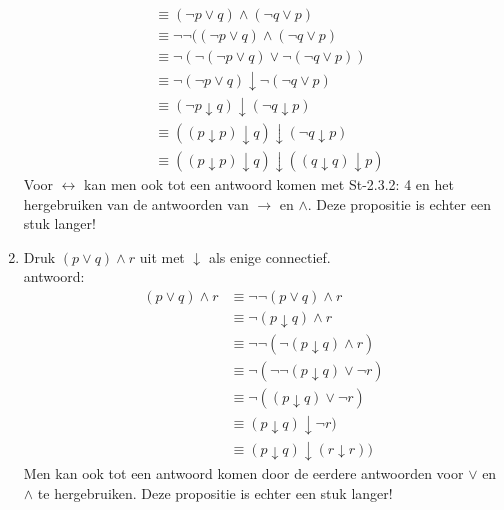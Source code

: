 \begin{answer}
\begin{enumerate}[label=\textit{\alph*.}]
\begin{align}
&\equiv (\neg p\vee q) \wedge (\neg q \vee p) \tag{St-2.3.2: 7}\\
&\equiv \neg \neg ((\neg p\vee q)\wedge (\neg q\vee p) \tag{St-2.3.2: 1} \\
&\equiv \neg (\neg (\neg p\vee q)\vee \neg (\neg q\vee p)) \tag{St-2.3.2: 10}\\
&\equiv \neg (\neg p\vee q) \downarrow \neg (\neg q\vee p)\tag{Quine Dagger}\\
&\equiv (\neg p\downarrow q)\downarrow (\neg q\downarrow p) \tag{Quine Dagger}\\
&\equiv ((p\downarrow p)\downarrow q)\downarrow (\neg q\downarrow p) \tag{zie antwoord $\neg$}\\
&\equiv ((p\downarrow p)\downarrow q)\downarrow ((q\downarrow q)\downarrow p) \tag{zie antwoord $\neg$}
\end{align}
Voor $\leftrightarrow$ kan men ook tot een antwoord komen met St-2.3.2: 4 en het hergebruiken van de antwoorden van $\rightarrow$ en $\land$. Deze propositie is echter een stuk langer!

\item Druk $(p\lor q)\land r$ uit met $\downarrow$ als enige connectief. \\
antwoord:
\begin{align}
(p\vee q) \wedge r &\equiv \neg \neg (p\vee q) \wedge r \tag{St-2.3.2: 1}\\
&\equiv \neg (p\downarrow q) \wedge r \tag{Quine Dagger}\\
&\equiv \neg \neg (\neg (p\downarrow q) \wedge r) \tag{St-2.3.2: 1}\\
&\equiv \neg (\neg \neg (p\downarrow q) \vee \neg r) \tag{St-2.3.2: 10}\\
&\equiv \neg ((p\downarrow q) \vee \neg r) \tag{St-2.3.2: 1}\\
&\equiv (p\downarrow q) \downarrow \neg r) \tag{Quine Dagger}\\
&\equiv (p\downarrow q) \downarrow (r\downarrow r)) \tag{zie antwoord $\neg$}
\end{align}
Men kan ook tot een antwoord komen door de eerdere antwoorden voor $\lor$ en $\land$ te hergebruiken. Deze propositie is echter een stuk langer!
\end{enumerate}
\end{answer}

